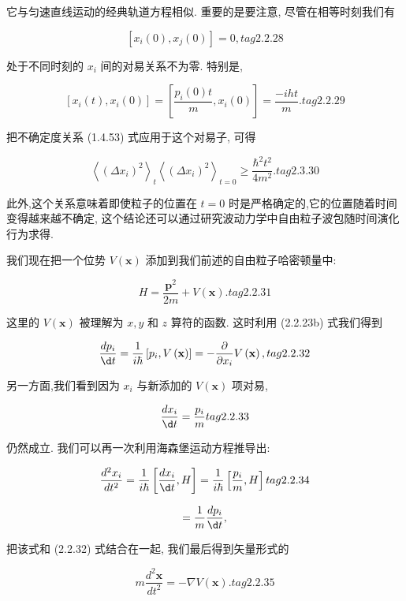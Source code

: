 \documentclass[lang=cn,newtx,10pt,scheme=chinese,thmcnt=section]{elegantbook}
\begin{document}
它与匀速直线运动的经典轨道方程相似. 重要的是要注意, 尽管在相等时刻我们有

$$
\left\lbrack {{x}_{i}\left( 0\right) ,{x}_{j}\left( 0\right) }\right\rbrack = 0, tag{2.2.28}
$$

处于不同时刻的 ${x}_{i}$ 间的对易关系不为零. 特别是,

$$
\left\lbrack {{x}_{i}\left( t\right) ,{x}_{i}\left( 0\right) }\right\rbrack = \left\lbrack {\frac{{p}_{i}\left( 0\right) t}{m},{x}_{i}\left( 0\right) }\right\rbrack = \frac{-{iht}}{m}. tag{2.2.29}
$$

把不确定度关系 (1.4.53) 式应用于这个对易子, 可得

$$
{\left\langle {\left( \Delta {x}_{i}\right) }^{2}\right\rangle }_{t}{\left\langle {\left( \Delta {x}_{i}\right) }^{2}\right\rangle }_{t = 0} \geq \frac{{\hbar }^{2}{t}^{2}}{4{m}^{2}}. tag{2.3.30}
$$

此外,这个关系意味着即使粒子的位置在 $t = 0$ 时是严格确定的,它的位置随着时间变得越来越不确定, 这个结论还可以通过研究波动力学中自由粒子波包随时间演化行为求得.

我们现在把一个位势 $V\left( \mathbf{x}\right)$ 添加到我们前述的自由粒子哈密顿量中:

$$
H = \frac{{\mathbf{p}}^{2}}{2m} + V\left( \mathbf{x}\right) . tag{2. 2.31}
$$

这里的 $V\left( \mathbf{x}\right)$ 被理解为 $x, y$ 和 $z$ 算符的函数. 这时利用 (2.2.23b) 式我们得到

$$
\frac{d{p}_{i}}{\d t} = \frac{1}{i\hbar }\left\lbrack {{p}_{i}, V\left( \mathbf{x}\right) }\right\rbrack = - \frac{\partial }{\partial {x}_{i}}V\left( \mathbf{x}\right) , tag{2. 2.32}
$$

另一方面,我们看到因为 ${x}_{i}$ 与新添加的 $V\left( \mathbf{x}\right)$ 项对易,

$$
\frac{d{x}_{i}}{\d t} = \frac{{p}_{i}}{m} tag{2. 2.33}
$$

仍然成立. 我们可以再一次利用海森堡运动方程推导出:

$$
\frac{{d}^{2}{x}_{i}}{d{t}^{2}} = \frac{1}{i\hbar }\left\lbrack {\frac{d{x}_{i}}{\d t}, H}\right\rbrack = \frac{1}{i\hbar }\left\lbrack {\frac{{p}_{i}}{m}, H}\right\rbrack tag{2. 2.34}
$$

$$
= \frac{1}{m}\frac{d{p}_{i}}{\d t},
$$

把该式和 (2.2.32) 式结合在一起, 我们最后得到矢量形式的

$$
m\frac{{d}^{2}\mathbf{x}}{d{t}^{2}} = - \nabla V\left( \mathbf{x}\right) . tag{2. 2.35}
$$
\end{document}

